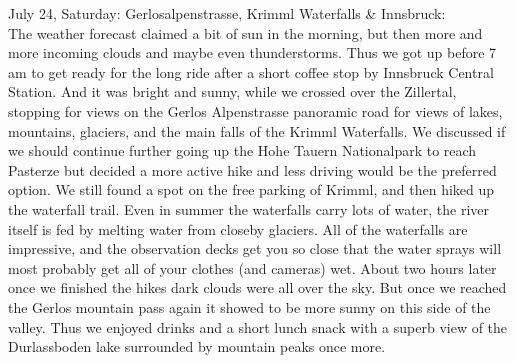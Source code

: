 {July 24, Saturday: Gerlosalpenstrasse, Krimml Waterfalls \& Innsbruck:\\
The weather forecast claimed a bit of sun in the morning, but then more and more incoming clouds and maybe even thunderstorms. Thus we got up before 7 am to get ready for the long ride after a short coffee stop by Innsbruck Central Station. And it was bright and sunny, while we crossed over the Zillertal, stopping for views on the Gerlos Alpenstrasse panoramic road for views of lakes, mountains, glaciers, and the main falls of the Krimml Waterfalls. We discussed if we should continue further going up the Hohe Tauern Nationalpark to reach Pasterze but decided a more active hike and less driving would be the preferred option. We still found a spot on the free parking of Krimml, and then hiked up the waterfall trail. Even in summer the waterfalls carry lots of water, the river itself is fed by melting water from closeby glaciers. All of the waterfalls are impressive, and the observation decks get you so close that the water sprays will most probably get all of your clothes (and cameras) wet. About two hours later once we finished the hikes dark clouds were all over the sky. But once we reached the Gerlos mountain pass again it showed to be more sunny on this side of the valley. Thus we enjoyed drinks and a short lunch snack with a superb view of the Durlassboden lake surrounded by mountain peaks once more.\\

}

